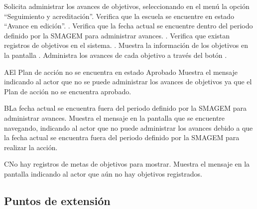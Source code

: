  \begin{UCtrayectoria}
    \UCpaso[\UCactor] Solicita administrar los avances de objetivos, seleccionando en el menú  la opción ``Seguimiento y acreditación''.
    \UCpaso[\UCsist] Verifica que la escuela se encuentre en estado ``Avance en edición''. .
    \UCpaso[\UCsist] Verifica que la fecha actual se encuentre dentro del periodo definido por la SMAGEM para administrar avances. .
    \UCpaso[\UCsist] Verifica que existan registros de objetivos en el sistema. .
    \UCpaso[\UCsist] Muestra la información de los objetivos en la pantalla .
    \UCpaso[\UCactor] Administra los avances de cada objetivo a través del botón \botAcciones. \label{cus1:Administrar}
 \end{UCtrayectoria}
 
 \begin{UCtrayectoriaA}{A}{El Plan de acción no se encuentra en estado Aprobado}
    \UCpaso[\UCactor] Muestra el mensaje   indicando al actor que no se puede administrar los avances de objetivos ya que el Plan de acción no se encuentra aprobado.
 \end{UCtrayectoriaA}

    \begin{UCtrayectoriaA}{B}{La fecha actual se encuentra fuera del periodo definido por la SMAGEM para  administrar avances.}
    \UCpaso[\UCsist] Muestra el mensaje  en la pantalla que se encuentre navegando, indicando al actor que no puede administrar los avances debido a que la fecha actual se encuentra fuera del periodo definido por la SMAGEM para realizar la acción. 
    \end{UCtrayectoriaA}

\begin{UCtrayectoriaA}{C}{No hay registros de metas de objetivos para mostrar.}
    \UCpaso[\UCsist] Muestra el mensaje  en la pantalla  indicando al actor que aún no hay objetivos registrados. 
 \end{UCtrayectoriaA}

\subsection{Puntos de extensión}

